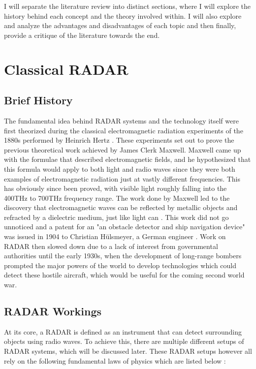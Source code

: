\documentclass[11pt]{report}
\begin{document}
I will separate the literature review into distinct sections, where I will explore the history behind each concept and the theory involved within. I will also explore and analyze the advantages and disadvantages of each topic and then finally, provide a critique of the literature towards the end.



\section{Classical RADAR}
\subsection{Brief History}
The fundamental idea behind RADAR systems and the technology itself were first theorized during the classical electromagnetic radiation experiments of the 1880s performed by Heinrich Hertz \cite{skolnik_radar_2024}. These experiments set out to prove the previous theoretical work achieved by James Clerk Maxwell. Maxwell came up with the formulae that described electromagnetic fields, and he hypothesized that this formula would apply to both light and radio waves since they were both examples of electromagnetic radiation just at vastly different frequencies. This has obviously since been proved, with visible light roughly falling into the 400THz to 700THz frequency range. The work done by Maxwell led to the discovery that electromagnetic waves can be reflected by metallic objects and refracted by a dielectric medium, just like light can \cite{skolnik_radar_2024}. This work did not go unnoticed and a patent for an "an obstacle detector and ship navigation device" was issued in 1904 to Christian Hülsmeyer, a German engineer \cite{skolnik_radar_2024}. Work on RADAR then slowed down due to a lack of interest from governmental authorities until the early 1930s, when the development of long-range bombers prompted the major powers of the world to develop technologies which could detect these hostile aircraft, which would be useful for the coming second world war.



\subsection{RADAR Workings}
At its core, a RADAR is defined as an instrument that can detect surrounding objects using radio waves. To achieve this, there are multiple different setups of RADAR systems, which will be discussed later. These RADAR setups however all rely on the following fundamental laws of physics which are listed below \cite{christian_wolff_physical_2024}:
\end{document}
